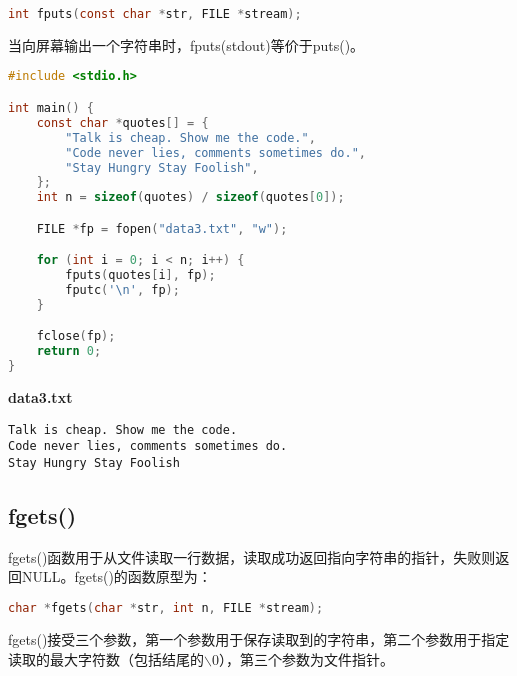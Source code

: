 \vspace{-0.5cm}

\begin{lstlisting}[language=C]
int fputs(const char *str, FILE *stream);
\end{lstlisting}

当向屏幕输出一个字符串时，fputs(stdout)等价于puts()。\\


\begin{lstlisting}[language=C]
#include <stdio.h>

int main() {
    const char *quotes[] = {
        "Talk is cheap. Show me the code.",
        "Code never lies, comments sometimes do.",
        "Stay Hungry Stay Foolish",
    };
    int n = sizeof(quotes) / sizeof(quotes[0]);

    FILE *fp = fopen("data3.txt", "w");

    for (int i = 0; i < n; i++) {
        fputs(quotes[i], fp);
        fputc('\n', fp);
    }

    fclose(fp);
    return 0;
}
\end{lstlisting}

\begin{tcolorbox}
    \textbf{data3.txt}
    \begin{verbatim}
Talk is cheap. Show me the code.
Code never lies, comments sometimes do.
Stay Hungry Stay Foolish
	\end{verbatim}
\end{tcolorbox}

\vspace{0.5cm}

\subsection{fgets()}

fgets()函数用于从文件读取一行数据，读取成功返回指向字符串的指针，失败则返回NULL。fgets()的函数原型为：

\vspace{-0.5cm}

\begin{lstlisting}[language=C]
char *fgets(char *str, int n, FILE *stream);
\end{lstlisting}

fgets()接受三个参数，第一个参数用于保存读取到的字符串，第二个参数用于指定读取的最大字符数（包括结尾的$ \backslash $0），第三个参数为文件指针。\\

